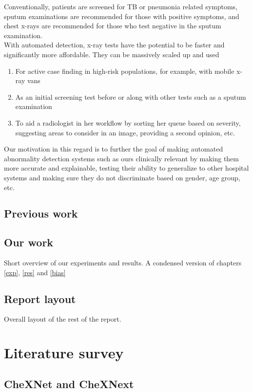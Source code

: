 \documentclass[12pt,twoside,a4paper]{report}
\begin{document}
Conventionally, patients are screened for TB or pneumonia related symptoms,
sputum examinations are recommended for those with positive symptoms, and chest
x-rays are recommended for those who test negative in the sputum examination.\\

With automated detection, x-ray tests have the potential to be faster and
significantly more affordable. They can be massively scaled up and used
\begin{enumerate}
\item{For active case finding in high-risk populations, for example, with mobile
    x-ray vans\cite{modi_suresh_2019}}
\item{As an initial screening test before or along with other tests such as a
    sputum examination}
\item{To aid a radiologist in her workflow by sorting her queue based on
    severity, suggesting areas to consider in an image, providing a second
    opinion, etc.}
\end{enumerate}

Our motivation in this regard is to further the goal of making automated
abnormality detection systems such as ours clinically relevant by making them
more accurate and explainable, testing their ability to generalize to other
hospital systems and making sure they do not discriminate based on gender, age
group, etc.
\section{Previous work}

\section{Our work}
Short overview of our experiments and results. A condensed version of chapters
\ref{exp}, \ref{res} and \ref{bias}
\section{Report layout}
Overall layout of the rest of the report.
\chapter{Literature survey\label{litsurvey}}
\section{CheXNet and CheXNext}
\end{document}
